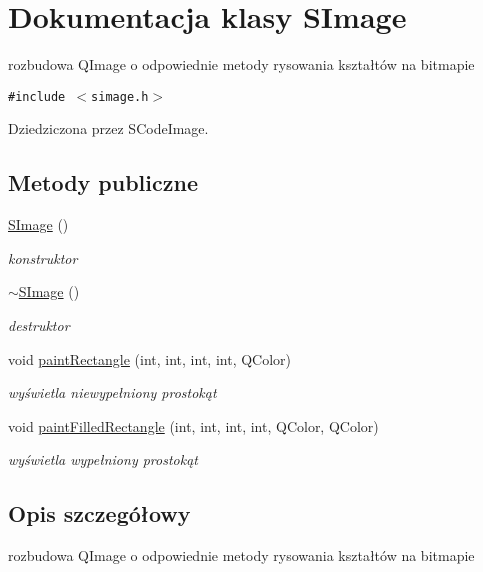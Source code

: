 \hypertarget{classSImage}{
\section{Dokumentacja klasy SImage}
\label{classSImage}
}
rozbudowa QImage o odpowiednie metody rysowania kształtów na bitmapie  


{\tt \#include $<$simage.h$>$}

Dziedziczona przez SCodeImage.

\subsection*{Metody publiczne}
\begin{CompactItemize}
\item 
\hyperlink{classSImage_76e408c8c9d80017ab4bcdcb4788de15}{SImage} ()
\begin{CompactList}\small\item\em konstruktor \item\end{CompactList}\item 
\hyperlink{classSImage_615b1cbc644a5d8b88fd6ec1efa8c732}{$\sim$SImage} ()
\begin{CompactList}\small\item\em destruktor \item\end{CompactList}\item 
void \hyperlink{classSImage_d5707899d17b97884f85d3ea42bd548d}{paintRectangle} (int, int, int, int, QColor)
\begin{CompactList}\small\item\em wyświetla niewypełniony prostokąt \item\end{CompactList}\item 
void \hyperlink{classSImage_dc89f8b2607722f6fbf52f481103bf71}{paintFilledRectangle} (int, int, int, int, QColor, QColor)
\begin{CompactList}\small\item\em wyświetla wypełniony prostokąt \item\end{CompactList}\end{CompactItemize}


\subsection{Opis szczegółowy}
rozbudowa QImage o odpowiednie metody rysowania kształtów na bitmapie 

